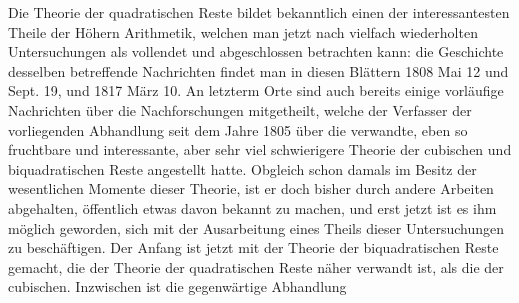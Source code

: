 Die Theorie der quadratischen Reste bildet bekanntlich einen der interessantesten Theile der Höhern Arithmetik, welchen man jetzt nach vielfach wiederholten Untersuchungen als vollendet und abgeschlossen betrachten kann: die Geschichte desselben betreffende Nachrichten findet man in diesen Blättern 1808 Mai 12 und Sept. 19, und 1817 März 10. An letzterm Orte sind auch bereits einige vorläufige Nachrichten über die Nachforschungen mitgetheilt, welche der Verfasser der vorliegenden Abhandlung seit dem Jahre 1805 über die verwandte, eben so fruchtbare und interessante, aber sehr viel schwierigere Theorie der cubischen und biquadratischen Reste angestellt hatte. Obgleich schon damals im Besitz der wesentlichen Momente dieser Theorie, ist er doch bisher durch andere Arbeiten abgehalten, öffentlich etwas davon bekannt zu machen, und erst jetzt ist es ihm möglich geworden, sich mit der Ausarbeitung eines Theils dieser Untersuchungen zu beschäftigen. Der Anfang ist jetzt mit der Theorie der biquadratischen Reste gemacht, die der Theorie der quadratischen Reste näher verwandt ist, als die der cubischen. Inzwischen ist die gegenwärtige Abhandlung
